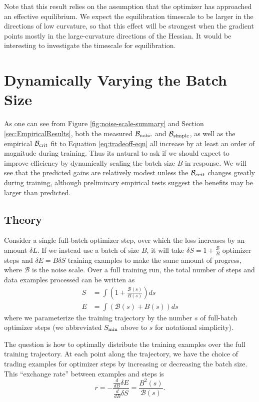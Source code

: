 \documentclass[english]{article}
\newcommand{\CB}{{\cal B}}
\begin{document}
Note that this result relies on the assumption that the optimizer has approached an effective equilibrium. We expect the equilibration timescale to be larger in the directions of low curvature, so that this effect will be strongest when the gradient points mostly in the large-curvature directions of the Hessian.  It would be interesting to investigate the timescale for equilibration.

\section{Dynamically Varying the Batch Size}

\label{app:DynamicBS}

As one can see from Figure \ref{fig:noise-scale-summary} and Section \ref{sec:EmpiricalResults}, both the measured $\mathcal{B}_{{\rm noise}}$ and $\mathcal{B}_{{\rm simple}}$, as well as the empirical $\mathcal{B}_{{\rm crit}}$ fit to Equation \ref{eq:tradeoff-eqn} all increase by at least an order of magnitude during training. Thus its natural to ask if we should expect to improve efficiency by dynamically scaling the batch size $B$ in response. We will see that the predicted gains are relatively modest unless the $\CB_{crit}$ changes greatly during training, although preliminary empirical tests suggest the benefits may be larger than predicted.

\subsection{Theory}

Consider a single full-batch optimizer step, over which the loss increases by an amount $\delta L$. If we instead use a batch of size $B$, it will take $\delta S=1+\frac{\mathcal{B}}{B}$ optimizer steps and $\delta E=B\delta S$ training examples to make the same amount of progress, where $\mathcal{B}$ is the noise scale.
Over a full training run, the total number of steps and data examples processed can be written as
\begin{align}
S & =\int\left(1+\frac{\mathcal{B}(s)}{B(s)}\right)ds\label{eq:total-steps-and-examples-apdx}\\
E & =\int\left(\mathcal{B}(s)+B(s)\right)ds\nonumber
\end{align}
where we parameterize the training trajectory by the number $s$ of full-batch optimizer steps (we abbreviated $S_{{\rm min}}$ above to $s$ for notational simplicity).

The question is how to optimally distribute the training examples over the full training trajectory. At each point along the trajectory, we have the choice of trading examples for optimizer steps by increasing or decreasing the batch size. This ``exchange rate'' between examples and steps is
\begin{equation}
r=-\frac{\frac{d}{dB}\delta E}{\frac{d}{dB}\delta S}=\frac{B^{2}(s)}{\mathcal{B}(s)}.
\end{equation}
\end{document}
